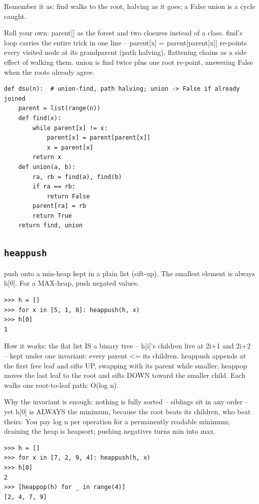 \documentclass[10pt,letterpaper]{book}
\begin{document}
Remember it as: find walks to the root, halving as it goes; a False union is a cycle caught.


Roll your own: parent[] as the forest and two closures instead of a class. find's loop carries the entire trick in one line -- parent[x] = parent[parent[x]] re-points every visited node at its grandparent (path halving), flattening chains as a side effect of walking them. union is find twice plus one root re-point, answering False when the roots already agree.

\begin{lstlisting}[style=ex]
def dsu(n):  # union-find, path halving; union -> False if already joined
    parent = list(range(n))
    def find(x):
        while parent[x] != x:
            parent[x] = parent[parent[x]]
            x = parent[x]
        return x
    def union(a, b):
        ra, rb = find(a), find(b)
        if ra == rb:
            return False
        parent[ra] = rb
        return True
    return find, union
\end{lstlisting}
\subsection{\texttt{heappush}}\label{def:heappush}
push onto a min-heap kept in a plain list (sift-up). The smallest element is always h[0]. For a MAX-heap, push negated values.
\begin{lstlisting}[style=ex]
>>> h = []
>>> for x in [5, 1, 8]: heappush(h, x)
>>> h[0]
1
\end{lstlisting}

How it works: the flat list IS a binary tree -- h[i]'s children live at 2i+1 and 2i+2 -- kept under one invariant: every parent <= its children. heappush appends at the first free leaf and sifts UP, swapping with its parent while smaller; heappop moves the last leaf to the root and sifts DOWN toward the smaller child. Each walks one root-to-leaf path: O(log n).


Why the invariant is enough: nothing is fully sorted -- siblings sit in any order -- yet h[0] is ALWAYS the minimum, because the root beats its children, who beat theirs. You pay log n per operation for a permanently readable minimum; draining the heap is heapsort; pushing negatives turns min into max.

\begin{lstlisting}[style=ex]
>>> h = []
>>> for x in [7, 2, 9, 4]: heappush(h, x)
>>> h[0]
2
>>> [heappop(h) for _ in range(4)]
[2, 4, 7, 9]
\end{lstlisting}
\end{document}
